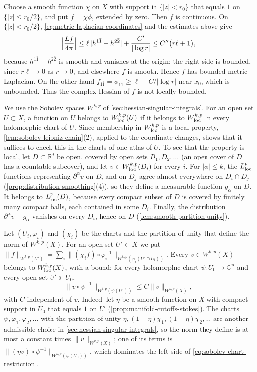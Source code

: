 \begin{example}
Choose a smooth function $\chi$ on $X$ with support in $\{|z|<r_0\}$ that equals $1$ on $\{|z|\leq r_0/2\}$, and put $f=\chi\phi$, extended by zero. Then $f$ is continuous. On $\{|z|<r_0/2\}$, \eqref{eq:metric-laplacian-coordinates} and the estimates above give
\[
 \Bigl|\frac{Lf}{4\pi}\Bigr|\leq\ell\,|h^{1\bar1}-h^{2\bar2}|+\frac{C'}{|\log r|}\leq C''\bigl(r\ell+1\bigr),
\]
because $h^{1\bar1}-h^{2\bar2}$ is smooth and vanishes at the origin; the right side is bounded, since $r\ell\to0$ as $r\to0$, and elsewhere $f$ is smooth. Hence $f$ has bounded metric Laplacian. On the other hand $f_{1\bar1}=\phi_{1\bar1}\geq\ell-C/|\log r|$ near $x_0$, which is unbounded. Thus the complex Hessian of $f$ is not locally bounded.
\end{example}

We use the Sobolev spaces $W^{k,p}$ of \cref{sec:hessian-singular-integrals}. For an open set $U\subset X$, a function on $U$ belongs to $W^{k,p}_{\mathrm{loc}}(U)$ if it belongs to $W^{k,p}_{\mathrm{loc}}$ in every holomorphic chart of $U$. Since membership in $W^{k,p}_{\mathrm{loc}}$ is a local property, \cref{lem:sobolev-leibniz-chain}(2), applied to the coordinate changes, shows that it suffices to check this in the charts of one atlas of $U$. To see that the property is local, let $D\subset\mathbb R^d$ be open, covered by open sets $D_1,D_2,\ldots$ (an open cover of $D$ has a countable subcover), and let $v\in W^{k,p}_{\mathrm{loc}}(D_i)$ for every $i$. For $|\alpha|\leq k$, the $L^p_{\mathrm{loc}}$ functions representing $\partial^\alpha v$ on $D_i$ and on $D_j$ agree almost everywhere on $D_i\cap D_j$ (\cref{prop:distribution-smoothing}(4)), so they define a measurable function $g_\alpha$ on $D$. It belongs to $L^p_{\mathrm{loc}}(D)$, because every compact subset of $D$ is covered by finitely many compact balls, each contained in some $D_i$. Finally, the distribution $\partial^\alpha v-g_\alpha$ vanishes on every $D_i$, hence on $D$ (\cref{lem:smooth-partition-unity}).

Let $(U_i,\varphi_i)$ and $(\chi_i)$ be the charts and the partition of unity that define the norm of $W^{k,p}(X)$. For an open set $U'\subset X$ we put $\|f\|_{W^{k,p}(U')}=\sum_i\|(\chi_if)\circ\varphi_i^{-1}\|_{W^{k,p}(\varphi_i(U'\cap U_i))}$. Every $v\in W^{k,p}(X)$ belongs to $W^{k,p}_{\mathrm{loc}}(X)$, with a bound: for every holomorphic chart $\psi\colon U_0\to\mathbb C^n$ and every open set $U'\Subset U_0$,
\begin{equation}\label{eq:sobolev-chart-restriction}
 \|v\circ\psi^{-1}\|_{W^{k,p}(\psi(U'))}\leq C\|v\|_{W^{k,p}(X)},
\end{equation}
with $C$ independent of $v$. Indeed, let $\eta$ be a smooth function on $X$ with compact support in $U_0$ that equals $1$ on $U'$ (\cref{prop:manifold-cutoffs-stokes}). The charts $\psi,\varphi_1,\varphi_2,\ldots$ with the partition of unity $\eta,(1-\eta)\chi_1,(1-\eta)\chi_2,\ldots$ are another admissible choice in \cref{sec:hessian-singular-integrals}, so the norm they define is at most a constant times $\|v\|_{W^{k,p}(X)}$; one of its terms is $\|(\eta v)\circ\psi^{-1}\|_{W^{k,p}(\psi(U_0))}$, which dominates the left side of \eqref{eq:sobolev-chart-restriction}.

